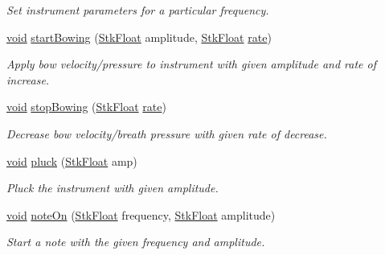 \begin{DoxyCompactItemize}
\begin{DoxyCompactList}\small\item\em Set instrument parameters for a particular frequency. \end{DoxyCompactList}\item 
\hyperlink{sound_8c_ae35f5844602719cf66324f4de2a658b3}{void} \hyperlink{class_nyq_1_1_banded_w_g_a72717166678a7b4ae58c655e065258ac}{start\+Bowing} (\hyperlink{namespace_nyq_a044fa20a706520a617bbbf458a7db7e4}{Stk\+Float} amplitude, \hyperlink{namespace_nyq_a044fa20a706520a617bbbf458a7db7e4}{Stk\+Float} \hyperlink{seqread_8c_ad89d3fac2deab7a9cf6cfc8d15341b85}{rate})
\begin{DoxyCompactList}\small\item\em Apply bow velocity/pressure to instrument with given amplitude and rate of increase. \end{DoxyCompactList}\item 
\hyperlink{sound_8c_ae35f5844602719cf66324f4de2a658b3}{void} \hyperlink{class_nyq_1_1_banded_w_g_a5bb194139b6776d8c5199086a5ce8916}{stop\+Bowing} (\hyperlink{namespace_nyq_a044fa20a706520a617bbbf458a7db7e4}{Stk\+Float} \hyperlink{seqread_8c_ad89d3fac2deab7a9cf6cfc8d15341b85}{rate})
\begin{DoxyCompactList}\small\item\em Decrease bow velocity/breath pressure with given rate of decrease. \end{DoxyCompactList}\item 
\hyperlink{sound_8c_ae35f5844602719cf66324f4de2a658b3}{void} \hyperlink{class_nyq_1_1_banded_w_g_a739dd3f1493886f512ddae0bf4861a48}{pluck} (\hyperlink{namespace_nyq_a044fa20a706520a617bbbf458a7db7e4}{Stk\+Float} amp)
\begin{DoxyCompactList}\small\item\em Pluck the instrument with given amplitude. \end{DoxyCompactList}\item 
\hyperlink{sound_8c_ae35f5844602719cf66324f4de2a658b3}{void} \hyperlink{class_nyq_1_1_banded_w_g_a3b88bf7ffb49a54bcfd7a610ef98ad1c}{note\+On} (\hyperlink{namespace_nyq_a044fa20a706520a617bbbf458a7db7e4}{Stk\+Float} frequency, \hyperlink{namespace_nyq_a044fa20a706520a617bbbf458a7db7e4}{Stk\+Float} amplitude)
\begin{DoxyCompactList}\small\item\em Start a note with the given frequency and amplitude. \end{DoxyCompactList}\item 

\end{DoxyCompactItemize}

